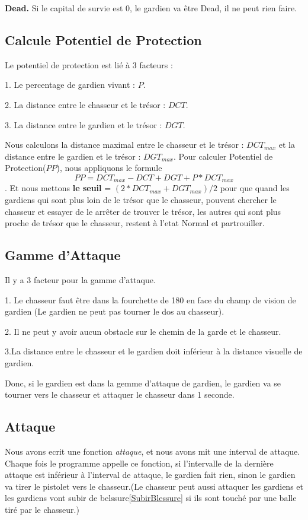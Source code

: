 \documentclass{article}
\begin{document}
\textbf{Dead.} Si le capital de survie est 0, le gardien va être Dead, il ne peut rien faire.

\subsection{Calcule Potentiel de Protection}
\label{calculeprotection}
Le potentiel de protection est lié à 3 facteurs : 

1. Le percentage de gardien vivant : $P$. 

2. La distance entre le chasseur et le trésor : $DCT$. 

3. La distance entre le gardien et le trésor : $DGT$.

Nous calculons la distance maximal entre le chasseur et le trésor : $DCT_{max}$ et la distance entre le gardien et le trésor : $DGT_{max}$. Pour calculer Potentiel de Protection($PP$), nous appliquons le formule $$PP =DCT_{max}-DCT + DGT + P* DCT_{max}$$.  Et nous mettons \textbf{le seuil} \label{seuil}  = 
$(2*DCT_{max} + DGT_{max})/2$ pour que quand les gardiens qui sont plus loin de le trésor que le chasseur, pouvent chercher le chasseur et essayer de le arrêter de trouver le trésor, les autres qui sont plus proche de trésor que le chasseur, restent à l'etat Normal et partrouiller.

\subsection{Gamme d'Attaque}
\label{gammeattaque}
Il y a 3 facteur pour la gamme d'attaque. 

1. Le chasseur faut être dans la fourchette de 180 en face du champ de vision de gardien (Le gardien ne peut pas tourner le dos au chasseur). 

2. Il ne peut y avoir aucun obstacle sur le chemin de la garde et le chasseur. 

3.La distance entre le chasseur et le gardien doit inférieur à la distance visuelle de gardien.

Donc, si le gardien est dans la gemme d'attaque de gardien, le gardien va se tourner vers le chasseur et attaquer le chasseur dans 1 seconde.

\subsection{Attaque}
\label{attaque}
Nous avons ecrit une fonction \textsl{attaque}, et nous avons mit une interval de attaque. Chaque fois le programme appelle ce fonction, si l'intervalle de la dernière attaque est inférieur à l'interval de attaque, le gardien fait rien, sinon le gardien va tirer le pistolet vers le chasseur.(Le chasseur peut aussi attaquer les gardiens et les gardiens vont subir de belssure\ref{SubirBlessure} si ils sont touché par une balle tiré par le chasseur.)
\end{document}
